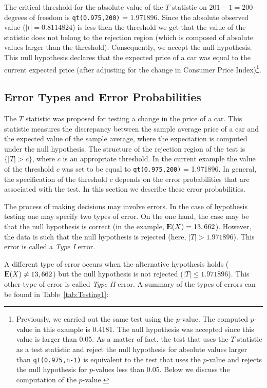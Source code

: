 \documentclass[]{krantz}
\newcommand{\Expec}{{\rm I\kern-.3em E}}
\theoremstyle{definition}
\theoremstyle{definition}
\theoremstyle{definition}
\theoremstyle{remark}
\begin{document}
The critical threshold for the absolute value of the \(T\) statistic on
\(201-1 = 200\) degrees of freedom is \texttt{qt(0.975,200)} = 1.971896.
Since the absolute observed value (\(|t| = 0.8114824\)) is less then the
threshold we get that the value of the statistic does not belong to the
rejection region (which is composed of absolute values larger than the
threshold). Consequently, we accept the null hypothesis. This null
hypothesis declares that the expected price of a car was equal to the
current expected price (after adjusting for the change in Consumer Price
Index)\footnote{Previously, we carried out the same test using the
  \(p\)-value. The computed \(p\)-value in this example is 0.4181. The
  null hypothesis was accepted since this value is larger than 0.05. As
  a matter of fact, the test that uses the \(T\) statistic as a test
  statistic and reject the null hypothesis for absolute values larger
  than \texttt{qt(0.975,n-1)} is equivalent to the test that uses the
  \(p\)-value and rejects the null hypothesis for \(p\)-values less than
  0.05. Below we discuss the computation of the \(p\)-value.}.

\subsection{Error Types and Error
Probabilities}\label{error-types-and-error-probabilities}

The \(T\) statistic was proposed for testing a change in the price of a
car. This statistic measures the discrepancy between the sample average
price of a car and the expected value of the sample average, where the
expectation is computed under the null hypothesis. The structure of the
rejection region of the test is \(\{|T| > c\}\), where \(c\) is an
appropriate threshold. In the current example the value of the threshold
\(c\) was set to be equal to \texttt{qt(0.975,200)} = 1.971896. In
general, the specification of the threshold \(c\) depends on the error
probabilities that are associated with the test. In this section we
describe these error probabilities.

The process of making decisions may involve errors. In the case of
hypothesis testing one may specify two types of error. On the one hand,
the case may be that the null hypothesis is correct (in the example,
\(\Expec(X) = 13,662\)). However, the data is such that the null
hypothesis is rejected (here, \(|T| > 1.971896\)). This error is called
a \emph{Type I} error.

A different type of error occurs when the alternative hypothesis holds
(\(\Expec(X) \not= 13,662\)) but the null hypothesis is not rejected
(\(|T| \leq 1.971896\)). This other type of error is called \emph{Type
II} error. A summary of the types of errors can be found in
Table~\ref{tab:Testing1}:
\end{document}
